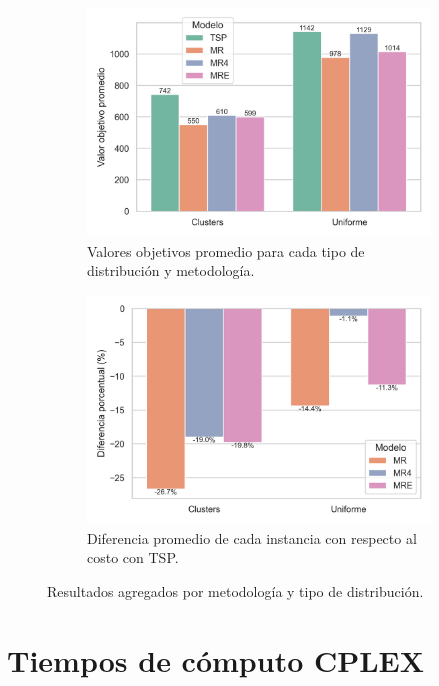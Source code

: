 \documentclass[10pt]{article}
\begin{document}
\begin{figure}[htbp]
	\centering
	
	\begin{subfigure}[b]{0.49\textwidth}
		\centering
		\includegraphics[width=\textwidth]{figuras/barras_costos.png}
		\caption{Valores objetivos promedio para cada tipo de distribución y metodología.}
		\label{fig:barras_costos}
	\end{subfigure}
	\hfill
	\begin{subfigure}[b]{0.49\textwidth}
		\centering
		\includegraphics[width=\textwidth]{figuras/barras_diferencias_pct.png}
		\caption{Diferencia promedio de cada instancia con respecto al costo con TSP.}
		\label{fig:dif_pct_costos}
	\end{subfigure}
	
	\caption{Resultados agregados por metodología y tipo de distribución.}
	\label{fig:comparacion_costos}
\end{figure}


\clearpage

\section{Tiempos de cómputo CPLEX}
\end{document}

